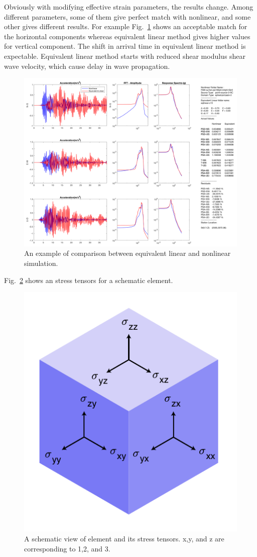 Obviously with modifying effective strain parameters, the results change. Among different parameters, some of them give perfect match with nonlinear, and some other gives different results. For example Fig.~\ref{fig:match_spherical_basin_3_point_source_2_HC_eqlinear_c13_2560_3072_96} shows an acceptable match for the horizontal components whereas equivalent linear method gives higher values for vertical component. The shift in arrival time in equivalent linear method is expectable. Equivalent linear method starts with reduced shear modulus shear wave velocity, which cause delay in wave propagation. 

 \begin{figure}[H]
    \centering
    \includegraphics[width=\textwidth]{figures/pdf/match_spherical_basin_3_point_source_2_HC_eqlinear_c13_2560_3072_96.pdf}
    \caption{An example of comparison between equivalent linear and nonlinear simulation.}
    \label{fig:match_spherical_basin_3_point_source_2_HC_eqlinear_c13_2560_3072_96}
\end{figure}

 Fig.~\ref{fig:element_stress_strain} shows an stress tensors for a schematic element. 

 \begin{figure}[H]
    \centering
    \includegraphics[width=100 px]{figures/pdf/element_stress_strain.pdf}
    \caption{A schematic view of element and its stress tensors. x,y, and z are corresponding to 1,2, and 3.}
    \label{fig:element_stress_strain}
\end{figure}


